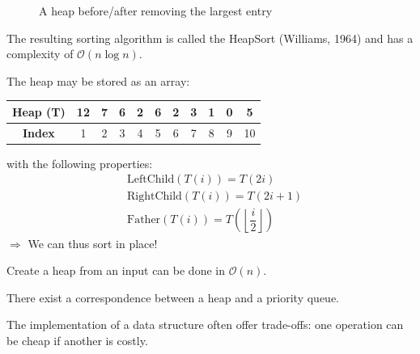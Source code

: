 \begin{figure}[htbp]
\centering
{}
\caption{A heap before/after removing the largest entry}
\label{tree4-5}
\end{figure}
The resulting sorting algorithm is called the HeapSort (Williams, 1964) and has a complexity of $\mathcal{O}(n\log n)$.

\begin{remark} The heap may be stored as an array: \\
\begin{center}
\begin{tabular}{|c|c|c|c|c|c|c|c|c|c|c|}
   \hline
   \textbf{Heap (T)} & 12 & 7 & 6 & 2 & 6 & 2 & 3 & 1 & 0 & 5 \\
   \hline 
   \textbf{Index} & 1 & 2 & 3 & 4 & 5 & 6 & 7 & 8 & 9 & 10 \\
   \hline
\end{tabular}
\end{center} 
\vspace*{0.4 cm} 
with the following properties:
\begin{align*}
& \text{LeftChild}(T(i)) = T(2i) \\
& \text{RightChild}(T(i)) = T(2i+1) \\
& \text{Father}(T(i)) = T\left( \left\lfloor\dfrac{i}{2}\right\rfloor \right)
\end{align*}
$\Rightarrow $ We can thus sort in place!
\end{remark}
\begin{remark} Create a heap from an input can be done in $\mathcal{O}(n)$.
\end{remark}
\begin{remark} There exist a correspondence between a heap and a priority queue.
\end{remark}
\begin{remark} The implementation of a data structure often offer trade-offs: one operation can be cheap if another is costly. 
\end{remark}


